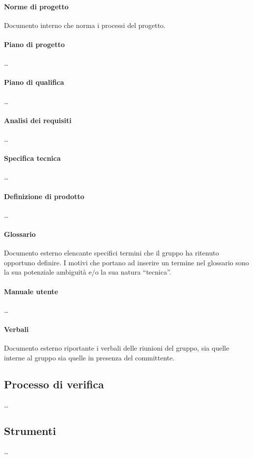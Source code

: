 \paragraph{Norme di progetto} Documento interno che norma i processi del progetto.
\paragraph{Piano di progetto} \dots
\paragraph{Piano di qualifica} \dots
\paragraph{Analisi dei requisiti} \dots
\paragraph{Specifica tecnica} \dots
\paragraph{Definizione di prodotto} \dots
\paragraph{Glossario} Documento esterno elencante specifici termini che il gruppo ha ritenuto opportuno definire. I motivi che portano ad inserire un termine nel glossario sono la sua potenziale ambiguità e/o la sua natura “tecnica”.
\paragraph{Manuale utente} \dots
\paragraph{Verbali} Documento esterno riportante i verbali delle riunioni del gruppo, sia quelle interne al gruppo sia quelle in presenza del committente.

\subsection{Processo di verifica} \dots

\subsection{Strumenti} \dots

